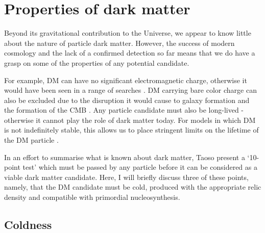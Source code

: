

\section{Properties of dark matter}
\label{intro:sec:properties}

Beyond its gravitational contribution to the Universe, we appear to know little about the nature of particle dark matter. However, the success of modern cosmology and the lack of a confirmed detection so far means that we do have a grasp on some of the properties of any potential candidate.

For example, DM can have no significant electromagnetic charge, otherwise it would have been seen in a range of searches \cite{Kudo:2001,Perl:2001,Gninenko:2007,Melchiorri:2007}. DM carrying bare color charge can also be excluded due to the disruption it would cause to galaxy formation \cite{Natarajan:2002} and the formation of the CMB \cite{Chen:2002}. Any particle candidate must also be long-lived - otherwise it cannot play the role of dark matter today. For models in which DM is not indefinitely stable, this allows us to place stringent limits on the lifetime of the DM particle \cite{Amigo:2009,Bell:2010}. %

In an effort to summarise what is known about dark matter, Taoso \etal \cite{Taoso:2008} present a `10-point test' which must be passed by any particle before it can be considered as a viable dark matter candidate. Here, I will briefly discuss three of these points, namely, that the DM candidate must be cold, produced with the appropriate relic density and compatible with primordial nucleosynthesis.

\subsection{Coldness}

